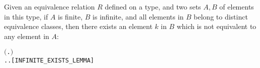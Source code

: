 \begin{lemma}
Given an equivalence relation $R$ defined on a type, and two sets $A, B$
of elements in this type, 
if $A$ is finite, $B$ is infinite, and all elements
in $B$ belong to distinct equivalence classes, then there exists an element $k$ in $B$
which is not equivalent to any element in $A$:
\begin{alltt}
\HOLTokenTurnstile{}   \HOLSymConst{\HOLTokenImp{}}
     \HOLSymConst{\HOLTokenConj{}}   \HOLSymConst{\HOLTokenConj{}} \ensuremath{(}\HOLSymConst{\HOLTokenForall{}} .  \HOLSymConst{\HOLTokenIn{}}  \HOLSymConst{\HOLTokenConj{}}  \HOLSymConst{\HOLTokenIn{}}  \HOLSymConst{\HOLTokenConj{}}  \HOLSymConst{\HOLTokenNotEqual{}}  \HOLSymConst{\HOLTokenImp{}} \HOLSymConst{\HOLTokenNeg{}}  \ensuremath{)} \HOLSymConst{\HOLTokenImp{}}
   \HOLSymConst{\HOLTokenExists{}}.  \HOLSymConst{\HOLTokenIn{}}  \HOLSymConst{\HOLTokenConj{}} \HOLSymConst{\HOLTokenForall{}}.  \HOLSymConst{\HOLTokenIn{}}  \HOLSymConst{\HOLTokenImp{}} \HOLSymConst{\HOLTokenNeg{}}  \hfill[INFINITE_EXISTS_LEMMA]
\end{alltt}
\end{lemma}

